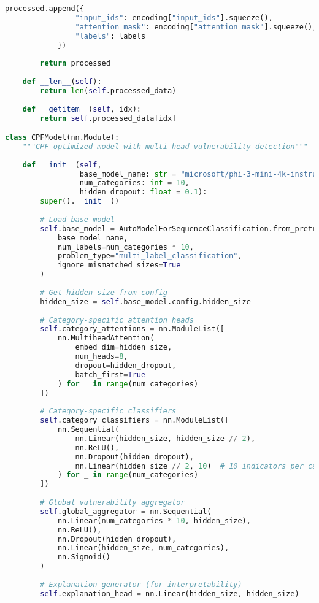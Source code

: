 \documentclass[11pt,a4paper]{article}
\begin{document}
\begin{lstlisting}[language=Python, caption=CPF Model Training Pipeline]
            processed.append({
                "input_ids": encoding["input_ids"].squeeze(),
                "attention_mask": encoding["attention_mask"].squeeze(),
                "labels": labels
            })
        
        return processed
    
    def __len__(self):
        return len(self.processed_data)
    
    def __getitem__(self, idx):
        return self.processed_data[idx]

class CPFModel(nn.Module):
    """CPF-optimized model with multi-head vulnerability detection"""
    
    def __init__(self, 
                 base_model_name: str = "microsoft/phi-3-mini-4k-instruct",
                 num_categories: int = 10,
                 hidden_dropout: float = 0.1):
        super().__init__()
        
        # Load base model
        self.base_model = AutoModelForSequenceClassification.from_pretrained(
            base_model_name,
            num_labels=num_categories * 10,
            problem_type="multi_label_classification",
            ignore_mismatched_sizes=True
        )
        
        # Get hidden size from config
        hidden_size = self.base_model.config.hidden_size
        
        # Category-specific attention heads
        self.category_attentions = nn.ModuleList([
            nn.MultiheadAttention(
                embed_dim=hidden_size,
                num_heads=8,
                dropout=hidden_dropout,
                batch_first=True
            ) for _ in range(num_categories)
        ])
        
        # Category-specific classifiers
        self.category_classifiers = nn.ModuleList([
            nn.Sequential(
                nn.Linear(hidden_size, hidden_size // 2),
                nn.ReLU(),
                nn.Dropout(hidden_dropout),
                nn.Linear(hidden_size // 2, 10)  # 10 indicators per category
            ) for _ in range(num_categories)
        ])
        
        # Global vulnerability aggregator
        self.global_aggregator = nn.Sequential(
            nn.Linear(num_categories * 10, hidden_size),
            nn.ReLU(),
            nn.Dropout(hidden_dropout),
            nn.Linear(hidden_size, num_categories),
            nn.Sigmoid()
        )
        
        # Explanation generator (for interpretability)
        self.explanation_head = nn.Linear(hidden_size, hidden_size)
        

\end{lstlisting}
\end{document}
